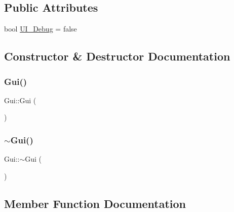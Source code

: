 \subsection*{Public Attributes}
\begin{DoxyCompactItemize}
\item 
bool \mbox{\hyperlink{class_gui_a0bbff076275c1bb854048a0048d5eeeb}{U\+I\+\_\+\+Debug}} = false
\end{DoxyCompactItemize}


\subsection{Constructor \& Destructor Documentation}
\mbox{\label{class_gui_ab2655dbb6d3a91d7e90cb83dad6c0450}} 
\subsubsection{\texorpdfstring{Gui()}{Gui()}}
{\footnotesize\ttfamily Gui\+::\+Gui (\begin{DoxyParamCaption}{ }\end{DoxyParamCaption})}

\mbox{\label{class_gui_a4fd8485d226f9b8a2ac2d81d7f0f3598}} 
\subsubsection{\texorpdfstring{$\sim$Gui()}{~Gui()}}
{\footnotesize\ttfamily Gui\+::$\sim$\+Gui (\begin{DoxyParamCaption}{ }\end{DoxyParamCaption})\hspace{0.3cm}{\ttfamily [virtual]}}



\subsection{Member Function Documentation}
\mbox{\label{class_gui_acc48dc0f342bdb1c94a7cf29bc0ede2d}} 
